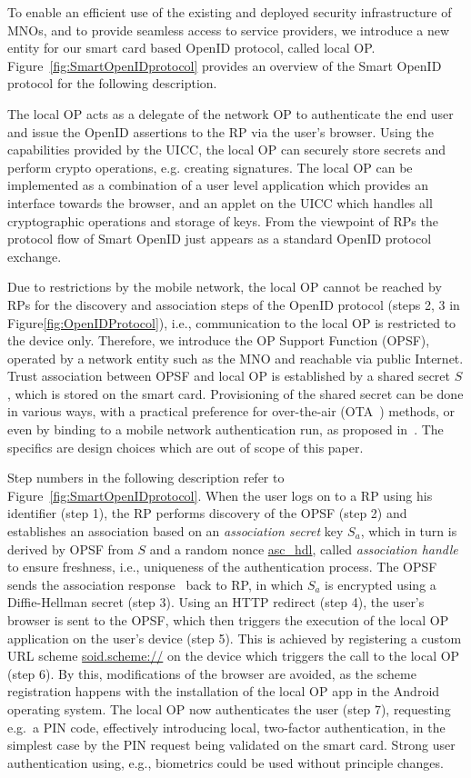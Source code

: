 \documentclass[runningheads,a4paper]{llncs}
\begin{document}
To enable an efficient use of the existing and deployed security infrastructure of MNOs, and to provide seamless access to service providers, we introduce a new entity for our smart card based OpenID protocol, called local OP. Figure~\ref{fig:SmartOpenIDprotocol} provides an overview of the Smart OpenID protocol for the following description. 


The local OP acts as a delegate of the network OP to authenticate the end user and issue the OpenID assertions to the RP via the user's browser.
Using the capabilities provided by the UICC, the local OP can securely store secrets and perform crypto operations, e.g. creating signatures.
The local OP can be implemented as a combination of a user level application which provides an interface towards the browser, and an applet on the UICC which handles all cryptographic operations and storage of keys.
From the viewpoint of RPs the protocol flow of Smart OpenID just appears as a standard OpenID protocol exchange.

Due to restrictions by the mobile network, the local OP cannot be reached by RPs for the discovery and association steps of the OpenID protocol (steps 2, 3 in Figure\ref{fig:OpenIDProtocol}), i.e., communication to the local OP is restricted to the device only.
Therefore, we introduce the OP Support Function (OPSF), operated by a network entity such as
the MNO and reachable via public Internet.
Trust association between OPSF and local OP is established by a shared secret $S$, which is stored on the smart card. Provisioning of the shared secret can be done in various ways, with a practical
preference for over-the-air (OTA~\cite{3gpp.31.115,3gpp.31.116}) methods, or even by binding to a mobile network authentication run, as proposed in~\cite{SmartOpenID_WWRF25}. The specifics are design choices which are out of scope of this paper.

Step numbers in the following description refer to Figure~\ref{fig:SmartOpenIDprotocol}. When the user logs on to a RP using his identifier (step 1), the RP performs discovery of the OPSF (step 2) and  establishes an association based on an \textit{association secret} key $S_a$, which in turn is derived by OPSF from $S$ and a random nonce \url{asc_hdl}, called \textit{association handle} to ensure freshness, i.e., uniqueness of the authentication process. The OPSF sends the association response~\cite[sec. 8.2]{OpenIDSpecs} back to RP, in which
$S_a$ is encrypted using a Diffie-Hellman secret (step 3).
Using an HTTP redirect (step 4), the user's browser is sent to the OPSF, which then triggers the execution of the local OP application on the user's device (step 5).
This is achieved by registering a custom URL scheme \url{soid.scheme://} on the device which triggers the call to the local OP (step 6). By this, modifications of the browser are avoided, as the 
scheme registration happens with the installation of the local OP app in the Android operating system.
The local OP now authenticates the user (step 7), requesting e.g.~a PIN code, effectively introducing
local, two-factor authentication, in the simplest case by the PIN request being validated on the smart card. Strong user authentication using, e.g., biometrics could be used without principle changes.
\end{document}
